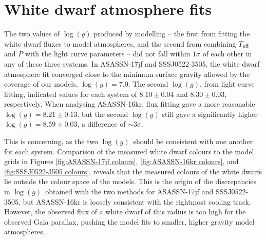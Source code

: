 

\section{White dwarf atmosphere fits}
\label{sect:three white dwarfs:method wd atmosphere fits}

The two values of $\log (g)$ produced by modelling -- the first from fitting the white dwarf fluxes to model atmospheres, and the second from combining $T_{\rm eff}$ and $P$ with the light curve parameters -- did not fall within $1\sigma$ of each other in any of these three systems.
In ASASSN-17jf and SSSJ0522-3505, the white dwarf atmosphere fit converged close to the minimum surface gravity allowed by the coverage of our models, $\log(g) = 7.0$.
The second $\log (g)$, from light curve fitting, indicated values for each system of $8.10\pm0.04$ and $8.30\pm0.03$, respectively.
When analysing ASASSN-16kr, flux fitting gave a more reasonable $\log(g)=8.21\pm0.13$, but the second $\log (g)$ still gave a significantly higher $\log(g)=8.59\pm0.03$, a difference of $\sim3\sigma$.

This is concerning, as the two $\log (g)$\ should be consistent with one another for each system.
Comparison of the measured white dwarf colours to the \citet{Bergeron1995} model grids in Figures \ref{fig:ASASSN-17jf colours}, \ref{fig:ASASSN-16kr colours}, and \ref{fig:SSSJ0522-3505 colours}, reveals that the measured colours of the white dwarfs lie outside the colour space of the models. This is the origin of the discrepancies in $\log (g)$\ obtained with the two methods for ASASSN-17jf and SSSJ0522-3505, but ASASSN-16kr is loosely consistent with the rightmost cooling track. However, the observed flux of a white dwarf of this radius is too high for the observed Gaia parallax, pushing the model fits to smaller, higher gravity model atmospheres.

